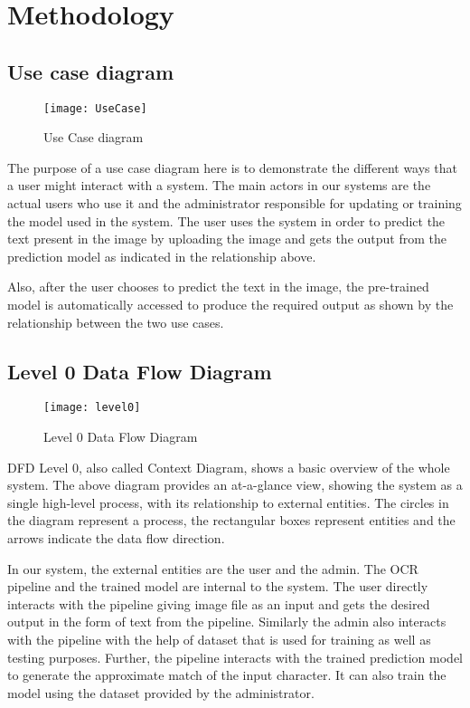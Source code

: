 \chapter{Methodology}

\section{Use case diagram}

\begin{figure}[htb]
\centering
\texttt{[image: UseCase]}
\caption{Use Case diagram}
\end{figure}

The purpose of a use case diagram here is to demonstrate the different ways that a user might interact with a system. The main actors in our systems are the actual users who use it and the administrator responsible for updating or training the model used in the system. The user uses the system in order to predict the text present in the image by uploading the image and gets the output from the prediction model as indicated in the relationship above.

Also, after the user chooses to predict the text in the image, the pre-trained model is automatically accessed to produce the required output as shown by the relationship between the two use cases.

\section{Level 0 Data Flow Diagram}

\begin{figure}[htb]
\centering
\texttt{[image: level0]}
\caption{Level 0 Data Flow Diagram}
\end{figure}

DFD Level 0, also called Context Diagram, shows a basic overview of the whole system. The above diagram provides an at-a-glance view, showing the system as a single high-level process, with its relationship to external entities. The circles in the diagram represent a process, the rectangular boxes represent entities and the arrows indicate the data flow direction.

In our system, the external entities are the user and the admin. The OCR pipeline and the trained model are internal to the system. The user directly interacts with the pipeline giving image file as an input and gets the desired output in the form of text from the pipeline. Similarly the admin also interacts with the pipeline with the help of dataset that is used for training as well as testing purposes. Further, the pipeline interacts with the trained prediction model to generate the approximate match of the input character. It can also train the model using the dataset provided by the administrator.


